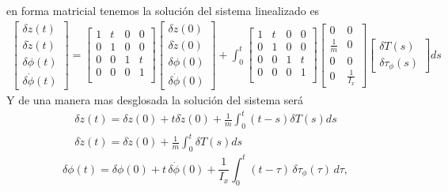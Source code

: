 \documentclass{uofa-eng-assignment}
\begin{document}
en forma matricial tenemos la solución del sistema linealizado es
\begin{align*}
    \begin{bmatrix}
    \delta z(t) \\
    \delta \dot{z}(t) \\
    \delta \phi(t) \\
    \delta \dot{\phi}(t)
    \end{bmatrix}= \begin{bmatrix}
                1 & t & 0 & 0 \\
        0 & 1 & 0 & 0 \\
        0 & 0 & 1 & t \\
        0 & 0 & 0 & 1 \\
    \end{bmatrix} \begin{bmatrix}
        \delta z(0) \\
        \delta \dot{z}(0) \\
        \delta \phi(0) \\
        \delta \dot{\phi}(0)
    \end{bmatrix} + \int_0^t \begin{bmatrix}
        1 & t & 0 & 0 \\
        0 & 1 & 0 & 0 \\
        0 & 0 & 1 & t \\
        0 & 0 & 0 & 1 \\
    \end{bmatrix} \begin{bmatrix}
        0 & 0 \\
        \frac{1}{m} & 0 \\
        0 & 0 \\
        0 & \frac{1}{I_x}
    \end{bmatrix} \begin{bmatrix}
        \delta T(s) \\
        \delta \tau_\phi(s)
    \end{bmatrix} ds
\end{align*}
Y de una manera mas desglosada la solución del sistema será
\begin{align*}
    \delta z(t) = \delta z(0)+ t \delta \dot{z}(0)+ \frac{1}{m}\int_0^t (t-s)\delta T(s) ds \\
    \delta \dot{z}(t) = \delta \dot{z}(0) + \frac{1}{m}\int_0^t \delta T(s) ds 
\end{align*}
\[
\delta \phi(t)
=
\delta \phi(0)
+
t\,\delta \dot{\phi}(0)
+
\frac{1}{I_x}
\int_{0}^{t}
(t-\tau)\,\delta \tau_{\phi}(\tau)\, d\tau,
\]
\end{document}
